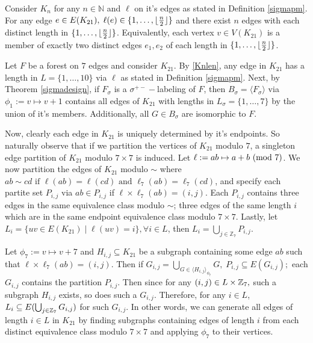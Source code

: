 \begin{observation}\label{Knlen}
  Consider $K_{n}$ for any $n\in \mathbb{N}$ and $\ell$ on it's edges as stated in Definition \ref{sigmapm}. For any edge $e\in E(K_{21}),\;\ell(e)\in \{1,\hdots,\lfloor\frac{n}{2}\rfloor\}$ and there exist $n$ edges with each distinct length in  $\{1,\hdots,\lfloor\frac{n}{2}\rfloor\}$. Equivalently, each vertex $v\in V(K_{21})$ is a member of exactly two distinct edges $e_{1},e_{2}$ of each length in $\{1,\hdots,\lfloor\frac{n}{2}\rfloor\}$.
\end{observation}
\newpage
\begin{construction}\label{K21design}
    Let $F$ be a forest on $7$ edges and consider $K_{21}$. By \ref{Knlen}, any edge in $K_{21}$ has a length in $L=\{1,\hdots,10\}$ via $\ell$ as stated in  Definition \ref{sigmapm}. Next, by Theorem \ref{sigmadesign}, if $F_{\sigma}$ is a $\sigma^{+-}-$labeling of $F$, then $B_{\sigma}=\langle F_{\sigma}\rangle$ via $\phi_{1}:=v\mapsto v+1$ contains all edges of $K_{21}$ with lengths in $L_{\sigma}=\{1,\hdots,7\}$ by the union of it's members. Additionally, all $G\in B_{\sigma}$ are isomorphic to $F$.

    Now, clearly each edge in $K_{21}$ is uniquely determined by it's endpoints. So naturally observe that if we partition the vertices of $K_{21}$ modulo $7$, a singleton edge partition of $K_{21}$ modulo $7\times 7$ is induced. Let $\ell:=ab\mapsto a+b\ (\mathrm{mod}\ 7)$. We now partition the edges of $K_{21}$ modulo $\sim$ where $ab\sim cd\text{ if } \ell(ab)=\ell(cd)\text{ and }\ell_{7}(ab)=\ell_{7}(cd)$, and specify each partite set $P_{i,j}$ via $ab\in P_{i,j}$ if $\ell\times \ell_{7}(ab)=(i,j)$. Each $P_{i,j}$ contains three edges in the same equivalence class modulo $\sim$; three edges of the same length $i$ which are in the same endpoint equivalence class modulo $7\times 7$. Lastly, let $L_{i}=\{uv\in E(K_{21})\mid \ell(uv)=i\},\forall i\in L$, then  $L_{i}=\bigcup_{j\in \mathbb{Z}_{7}}P_{i,j}$.

    Let $\phi_{7}:=v\mapsto v+7$ and $H_{i,j}\subseteq K_{21}$ be a subgraph containing some edge $ab$ such that $\ell\times \ell_{7}(ab)=(i,j)$. Then if $G_{i,j}=\bigcup_{G\in \langle H_{i,j}\rangle_{\phi_{7}}}G,\;P_{i,j}\subseteq E(G_{i,j});$ each $G_{i,j}$ contains the partition $P_{i,j}$. Then since for any $(i,j)\in L\times \mathbb{Z}_{7},$ such a subgraph $H_{i,j}$ exists, so does such a $G_{i,j}$. Therefore, for any $i\in L$, $L_{i}\subseteq E(\bigcup_{j\in \mathbb{Z}_{7}}G_{i,j})$ for such $G_{i,j}$. In other words, we can generate all edges of length $i\in L$ in $K_{21}$ by finding subgraphs containing edges of length $i$ from each distinct equivalence class modulo $7\times 7$ and applying $\phi_{7}$ to their vertices.


\end{construction}
